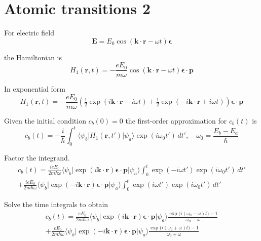 

\section*{Atomic transitions 2}

For electric field
\begin{equation*}
\mathbf E=E_0\cos(\mathbf k\cdot\mathbf r-\omega t)\boldsymbol{\epsilon}
\end{equation*}

the Hamiltonian is
\begin{equation*}
H_1(\mathbf r,t)=-\frac{eE_0}{m\omega}
\cos(\mathbf k\cdot\mathbf r-\omega t)
\boldsymbol{\epsilon}\cdot\mathbf p
\end{equation*}

In exponential form
\begin{equation*}
H_1(\mathbf r,t)=-\frac{eE_0}{m\omega}
\left(\tfrac{1}{2}\exp(i\mathbf k\cdot\mathbf r-i\omega t)
+\tfrac{1}{2}\exp(-i\mathbf k\cdot\mathbf r+i\omega t)\right)
\boldsymbol{\epsilon}\cdot\mathbf p
\end{equation*}

Given the initial condition $c_b(0)=0$ the first-order approximation for $c_b(t)$ is
\begin{equation*}
c_b(t)=-\frac{i}{\hbar}\int_0^t
\langle\psi_b|H_1(\mathbf r,t')|\psi_a\rangle\exp(i\omega_0t')\,dt',\quad
\omega_0=\frac{E_b-E_a}{\hbar}
\end{equation*}

Factor the integrand.
\begin{multline*}
c_b(t)
=\frac{ieE_0}{2m\hbar\omega}
\langle\psi_b|\exp(i\mathbf k\cdot\mathbf r)\boldsymbol{\epsilon}\cdot\mathbf p|\psi_a\rangle
\int_0^t\exp(-i\omega t')\exp(i\omega_0t')\,dt'
\\
+\frac{ieE_0}{2m\hbar\omega}
\langle\psi_b|\exp(-i\mathbf k\cdot\mathbf r)\boldsymbol{\epsilon}\cdot\mathbf p|\psi_a\rangle
\int_0^t\exp(i\omega t')\exp(i\omega_0t')\,dt'
\end{multline*}

Solve the time integrals to obtain
\begin{multline*}
c_b(t)=\frac{eE_0}{2m\hbar\omega}
\langle\psi_b|\exp(i\mathbf k\cdot\mathbf r)\boldsymbol{\epsilon}\cdot\mathbf p|\psi_a\rangle
\frac{\exp\bigl(i(\omega_0-\omega)t\bigr)-1}{\omega_0-\omega}
\\
+\frac{eE_0}{2m\hbar\omega}
\langle\psi_b|\exp(-i\mathbf k\cdot\mathbf r)\boldsymbol{\epsilon}\cdot\mathbf p|\psi_a\rangle
\frac{\exp\bigl(i(\omega_0+\omega)t\bigr)-1}{\omega_0+\omega}
\tag{1}
\end{multline*}

